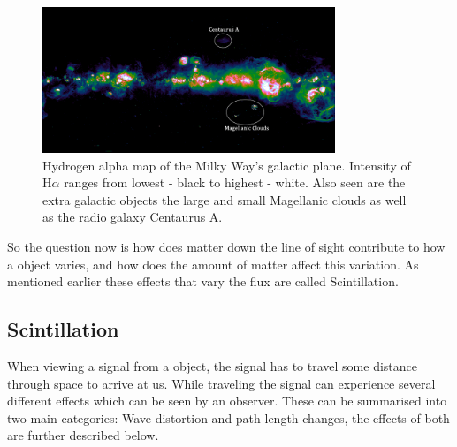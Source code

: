 \documentclass[10pt,a4paper]{article}
\begin{document}
\begin{figure}[H]
\begin{center}
	\includegraphics[width=0.78\textwidth]{Ha1_annotated}
	\caption{Hydrogen alpha map of the Milky Way's galactic plane. Intensity of H$\alpha$ ranges from lowest - black to highest - white. Also seen are the extra galactic objects the large and small Magellanic clouds as well as the radio galaxy Centaurus A.}
	\label{Halpha}
\end{center}
\end{figure}
So the question now is how does matter down the line of sight contribute to how a object varies, and how does the amount of matter affect this variation. As mentioned earlier these effects that vary the flux are called Scintillation.

\subsection{Scintillation}\label{scint}
When viewing a signal from a object, the signal has to travel some distance through space to arrive at us. While traveling the signal can experience several different effects which can be seen by an observer. These can be summarised into two main categories: Wave distortion and path length changes, the effects of both are further described below.
\end{document}
